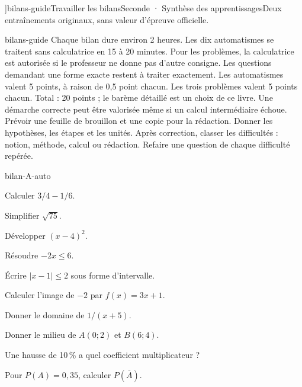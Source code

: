 \editionPage[\pdfbookmark[0]{Deux bilans de fin d’année}{bm-bilans}]{bilans-guide}{Travailler les bilans}{Seconde · Synthèse des apprentissages}{Deux entraînements originaux, sans valeur d’épreuve officielle.}
\begin{blocEdition}{bilans-guide}
Chaque bilan dure environ 2 heures. Les dix automatismes se traitent sans calculatrice en 15 à 20 minutes. Pour les problèmes, la calculatrice est autorisée si le professeur ne donne pas d’autre consigne. Les questions demandant une forme exacte restent à traiter exactement.
Les automatismes valent 5 points, à raison de 0,5 point chacun. Les trois problèmes valent 5 points chacun. Total : 20 points ; le barème détaillé est un choix de ce livre. Une démarche correcte peut être valorisée même si un calcul intermédiaire échoue.
Prévoir une feuille de brouillon et une copie pour la rédaction. Donner les hypothèses, les étapes et les unités. Après correction, classer les difficultés : notion, méthode, calcul ou rédaction. Refaire une question de chaque difficulté repérée.
\end{blocEdition}
\begin{blocEdition}{bilan-A-auto}
\begin{questions}
\item Calculer $3/4-1/6$.
\item Simplifier $\sqrt{75}$.
\item Développer $(x-4)^2$.
\item Résoudre $-2x\le6$.
\item Écrire $|x-1|\le2$ sous forme d’intervalle.
\item Calculer l’image de $-2$ par $f(x)=3x+1$.
\item Donner le domaine de $1/(x+5)$.
\item Donner le milieu de $A(0;2)$ et $B(6;4)$.
\item Une hausse de 10\,\% a quel coefficient multiplicateur ?
\item Pour $P(A)=0{,}35$, calculer $P(\overline A)$.
\end{questions}
\end{blocEdition}
